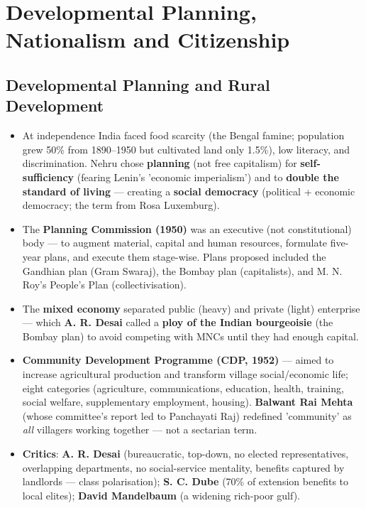 \chapter{Developmental Planning, Nationalism and Citizenship}

\section{Developmental Planning and Rural Development}

\begin{KeyConcept}
\begin{itemize}
\item At independence India faced food scarcity (the Bengal famine; population grew 50\% from 1890--1950 but cultivated land only 1.5\%), low literacy, and discrimination. Nehru chose \textbf{planning} (not free capitalism) for \textbf{self-sufficiency} (fearing Lenin's 'economic imperialism') and to \textbf{double the standard of living} --- creating a \textbf{social democracy} (political + economic democracy; the term from Rosa Luxemburg).
\item The \textbf{Planning Commission (1950)} was an executive (not constitutional) body --- to augment material, capital and human resources, formulate five-year plans, and execute them stage-wise. Plans proposed included the Gandhian plan (Gram Swaraj), the Bombay plan (capitalists), and M. N. Roy's People's Plan (collectivisation).
\item The \textbf{mixed economy} separated public (heavy) and private (light) enterprise --- which \textbf{A. R. Desai} called a \textbf{ploy of the Indian bourgeoisie} (the Bombay plan) to avoid competing with MNCs until they had enough capital.
\item \textbf{Community Development Programme (CDP, 1952)} --- aimed to increase agricultural production and transform village social/economic life; eight categories (agriculture, communications, education, health, training, social welfare, supplementary employment, housing). \textbf{Balwant Rai Mehta} (whose committee's report led to Panchayati Raj) redefined 'community' as \emph{all} villagers working together --- not a sectarian term.
\item \textbf{Critics}: \textbf{A. R. Desai} (bureaucratic, top-down, no elected representatives, overlapping departments, no social-service mentality, benefits captured by landlords --- class polarisation); \textbf{S. C. Dube} (70\% of extension benefits to local elites); \textbf{David Mandelbaum} (a widening rich-poor gulf).

\end{itemize}
\end{KeyConcept}
